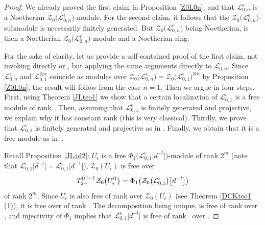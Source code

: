 \documentclass[10pt,a4paper]{amsart}
\numberwithin{equation}{section}
\theoremstyle{definition}
\newcommand{\e}{\epsilon}
\newcommand{\Ll}{{\mathcal L}}
\begin{document}
\begin{proof} We already proved the first claim in Proposition \ref{Z0L0n}, and that $\Ll_{0,n}^\e$ is a Noetherian $\mathcal{Z}_0\bigl(\Ll_{0,n}^\e\bigr)$-module. For the second claim, it follows that the $\mathcal{Z}_0\bigl(\Ll_{0,n}^\e\bigr)$-submodule \smash{$\bigl(\Ll_{0,n}^\e\bigr)^{U_\e}$} is necessarily finitely generated. But $\mathcal{Z}_0\bigl(\Ll_{0,n}^\e\bigr)$ being Noetherian, \smash{$\bigl(\Ll_{0,n}^\e\bigr)^{U_\e}$} is then a Noetherian $\mathcal{Z}_0\bigl(\Ll_{0,n}^\e\bigr)$-module and a Noetherian ring.

For the sake of clarity, let us provide a self-contained proof of the first claim, not invoking directly \cite{BGS,DC-L} or \cite{AnGa,BC}, but applying the same arguments directly to $\Ll_{0,n}^\e$. Since $\Ll_{0,n}^\e$ and $\Ll_{0,1}^{\otimes n}$ coincide as modules over $\mathcal{Z}_0\bigl(\Ll_{0,n}^\e\bigr)=\mathcal{Z}_0\bigl(\Ll_{0,1}^\e\bigr)^{\otimes n}$ by Proposition \ref{Z0L0n}, the result will follow from the case $n=1$. Then we argue in four steps. First, using Theorem \ref{JLteo1} we show that a certain localization of $\Ll_{0,1}^\e$ is a free module of rank . Then, assuming that $\Ll_{0,1}^\e$ is finitely generated and projective, we explain why it has constant rank  (this is very classical). Thirdly, we prove that $\Ll_{0,1}^\e$ is finitely generated and projective as in \cite[Theorem 7.2]{DC-L}. Finally, we obtain that it is a free module as in~\cite{BGS}.

Recall Proposition \ref{JLad2}: $U_\e$ is a free $\Phi_1\big(\Ll_{0,1}^\e\big[d^{-l}\big]\big)$-module of rank $2^m$ \big(note that $\Ll_{0,1}^\e\big[d^{-l}\big]=\Ll_{0,1}^\e\big[d^{-1}\big]$\big), $\mathcal{Z}_0(U_\e)$ is free over
\[
T_{2-}^{(l)-1}\mathcal{Z}_0\big(U_\e^{\rm lf}\big) = \Phi_1\big(\mathcal{Z}_0\bigl(\Ll_{0,1}^\e\bigr)\big[d^{-l}\big]\big)
\]
 of rank $2^m$. Since $U_\e$ is also free of rank  over $\mathcal{Z}_0(U_\e)$ (see Theorem \ref{DCKteo1}\,(1)), it is free over \smash{$\Phi_1\big(\mathcal{Z}_0\bigl(\Ll_{0,1}^\e\bigr)\big[d^{-l}\big]\big)$} of rank . The decomposition being unique, \smash{$\Phi_1\big(\Ll_{0,1}^\e\big[d^{-l}\big]\big)$} is free of rank  over \smash{$\Phi_1\big(\mathcal{Z}_0\bigl(\Ll_{0,1}^\e\bigr)\big[d^{-l}\big]\big)$}, and injectivity of $\Phi_1$ implies that $\Ll_{0,1}^\e\big[d^{-l}\big]$ is free of rank~ over \smash{$\mathcal{Z}_0\bigl(\Ll_{0,1}^\e\bigr)\big[d^{-l}\big]$}.


\end{proof}
\end{document}
